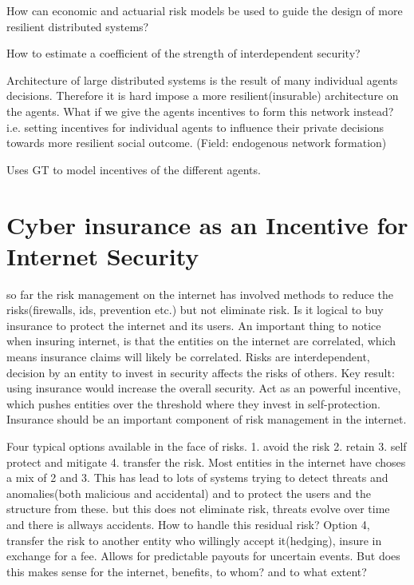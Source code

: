 How can economic and actuarial risk models be used to guide the design of more resilient distributed systems?

How to estimate a coefficient of the strength of interdependent security?

Architecture of large distributed systems is the result of many individual agents decisions. 
Therefore it is hard impose a more resilient(insurable) architecture on the agents. What if we give the agents incentives to form this network instead? i.e. setting incentives for individual agents to influence their private decisions towards more resilient social outcome. (Field: endogenous network formation)

Uses GT to model incentives of the different agents. 

\section{Cyber insurance as an Incentive for Internet Security}
\cite{bolot2008cyber}
so far the risk management on the internet has involved methods to reduce the
risks(firewalls, ids, prevention etc.) but not eliminate risk. Is it logical to buy
insurance to protect the internet and its users.
An important thing to notice when insuring internet, 
is that the entities on the internet are correlated, 
which means insurance claims will likely be correlated. Risks are interdependent, 
decision by an entity to invest in security affects the risks of others.
Key result: using insurance would increase the overall security. 
Act as an powerful incentive, which pushes entities over the threshold where they invest in self-protection.
 Insurance should be an important component of risk management in the internet.

Four typical options available in the face of risks. 
1. avoid the risk 2. retain 3. self protect and mitigate 4. transfer the risk.
Most entities in the internet have choses a mix of 2 and 3. This has lead to 
lots of systems trying to detect threats and anomalies(both malicious and accidental)
 and to protect the users and the structure from these.
but this does not eliminate risk, threats evolve over time and there is allways accidents.
How to handle this residual risk?
Option 4, transfer the risk to another entity who willingly accept it(hedging),
 insure in exchange for a fee. Allows for predictable payouts for uncertain events.
But does this makes sense for the internet, benefits, to whom? and to what extent?

